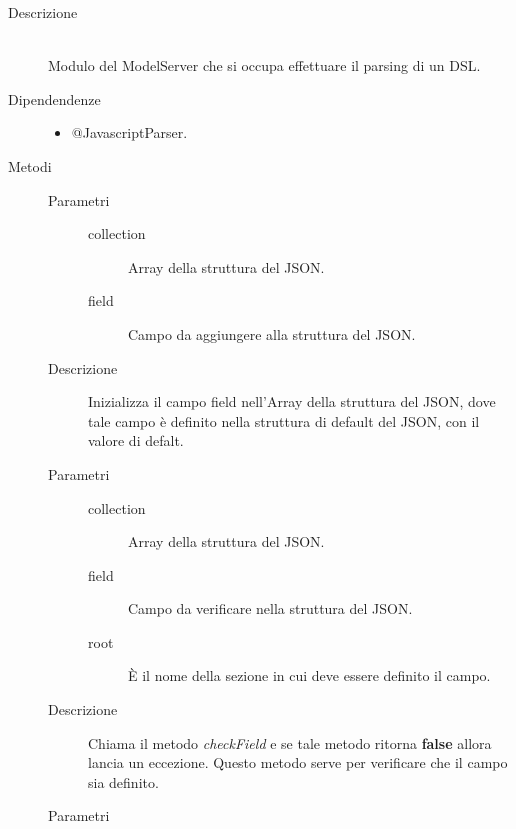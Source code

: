 \begin{description}
 \item[Descrizione] \hfill \\
  Modulo del ModelServer che si occupa effettuare il parsing di un DSL.
 \item[Dipendendenze] \hfill
 \begin{itemize}
  \item{@JavascriptParser}.
 \end{itemize}
  
 \item[Metodi]
 \begin{mldescription}
  \hfill 
 \begin{description}
     		\item[Parametri] \hfill
     			\begin{description}
     				\item[collection]
     				Array della struttura del JSON.
     				\item[field]
     				Campo da aggiungere alla struttura del JSON.
     			\end{description}
     		\item[Descrizione]
     		Inizializza il campo field nell'Array della struttura del JSON, dove tale campo è definito nella struttura di default del JSON, con il valore di defalt.
 \end{description}
 \hfill 
 \begin{description}
     		\item[Parametri] \hfill
     			\begin{description}
     				\item[collection]
     				Array della struttura del JSON.
     				\item[field]
     				Campo da verificare nella struttura del JSON.
     				\item[root]
     				\`{E} il nome della sezione in cui deve essere definito il campo.
     			\end{description}
     		\item[Descrizione]
     		Chiama il metodo \textit{checkField} e se tale metodo ritorna \textbf{false} allora lancia un eccezione. Questo metodo serve per verificare che il campo sia definito. 
  \end{description}
  \hfill 
 \begin{description}
     		\item[Parametri] \hfill

\end{description}
\end{mldescription}
\end{description}
